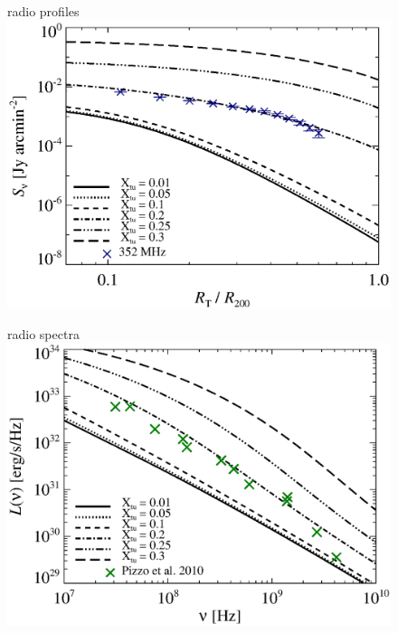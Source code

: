 \documentclass[fleqn,usenatbib,useAMS]{mnras}
\begin{document}
\begin{figure}
\begin{minipage}{1\columnwidth}
   \begin{center}\Large{radio profiles}\\
     \includegraphics[width=\columnwidth]{prof.comp.KrTTDth.Xtu.eps}
   \end{center}
\end{minipage}
\begin{minipage}{1\columnwidth}
   \begin{center}\Large{radio spectra}\\
     \includegraphics[width=\columnwidth]{spec.comp.KrTTDth.Xtu.eps}
   \end{center}
\end{minipage}

\end{figure}
\end{document}
